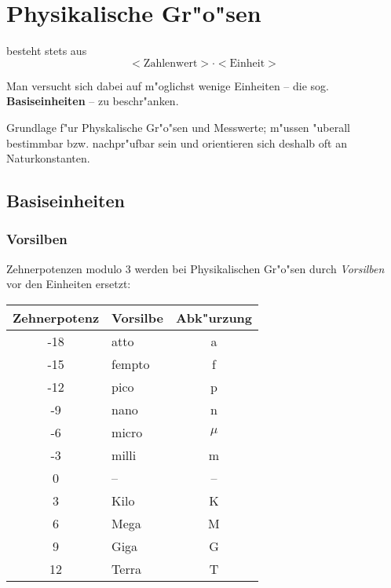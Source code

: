 \chapter{Physikalische Gr"o"sen}

\begin{Def}[Physikalische Gr"o"se]
   besteht stets aus
     $$
     <\text{Zahlenwert}> \cdot <\text{Einheit}>
     $$
\end{Def}
Man versucht sich dabei auf m"oglichst wenige Einheiten -- die
sog. \textbf{Basiseinheiten} -- zu beschr"anken.
\begin{Def}[Basiseinheit]
   Grundlage f"ur Physkalische Gr"o"sen und Messwerte; m"ussen "uberall
   bestimmbar bzw. nachpr"ufbar sein und orientieren sich deshalb oft
   an Naturkonstanten.
\end{Def}







\section{Basiseinheiten}



\subsection{Vorsilben}

Zehnerpotenzen modulo 3 werden bei Physikalischen Gr"o"sen durch
\emph{Vorsilben} vor den Einheiten ersetzt:
\begin{center}
\begin{tabular}{c l c}
\toprule
 Zehnerpotenz & Vorsilbe & Abk"urzung \\
 \midrule
-18 & atto & a\\ 
-15 & fempto & f \\ 
-12 & pico & p  \\
-9  & nano & n  \\
-6  & micro & $\mu$  \\
-3 & milli & m  \\
0  & -- & --  \\
3  & Kilo& K  \\
6  & Mega & M  \\
9  & Giga & G  \\
12 & Terra & T \\
\bottomrule
\end{tabular}
\end{center}







